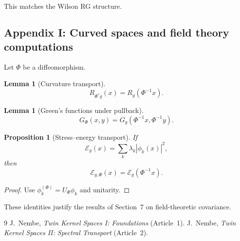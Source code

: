 \documentclass[11pt]{article}
\newtheorem{lemma}[theorem]{Lemma}
\newtheorem{proposition}[theorem]{Proposition}
\theoremstyle{definition}
\begin{document}
This matches the Wilson RG structure.

\subsection{Appendix I: Curved spaces and field theory computations}

Let $\Phi$ be a diffeomorphism.

\begin{lemma}[Curvature transport]
	\[
	R_{\Phi^\ast g}(x) = R_g(\Phi^{-1}x).
	\]
\end{lemma}

\begin{lemma}[Green’s functions under pullback]
	\[
	G_{\Phi}(x,y)=G_g(\Phi^{-1}x,\Phi^{-1}y).
	\]
\end{lemma}

\begin{proposition}[Stress–energy transport]
	If
	\[
	\mathcal{E}_g(x) = \sum_k \lambda_k|\phi_k(x)|^2,
	\]
	then
	\[
	\mathcal{E}_{g,\Phi}(x) = \mathcal{E}_g(\Phi^{-1}x).
	\]
\end{proposition}

\begin{proof}
	Use $\phi_k^{(\Phi)}=U_\Phi\phi_k$ and unitarity.
\end{proof}

These identities justify the results of Section~7 on field-theoretic covariance.


	
	\begin{thebibliography}{9}
	 J.~Nembe, \emph{Twin Kernel Spaces I: Foundations} (Article~1).
	 J.~Nembe, \emph{Twin Kernel Spaces II: Spectral Transport} (Article~2).
	\end{thebibliography}
\end{document}
